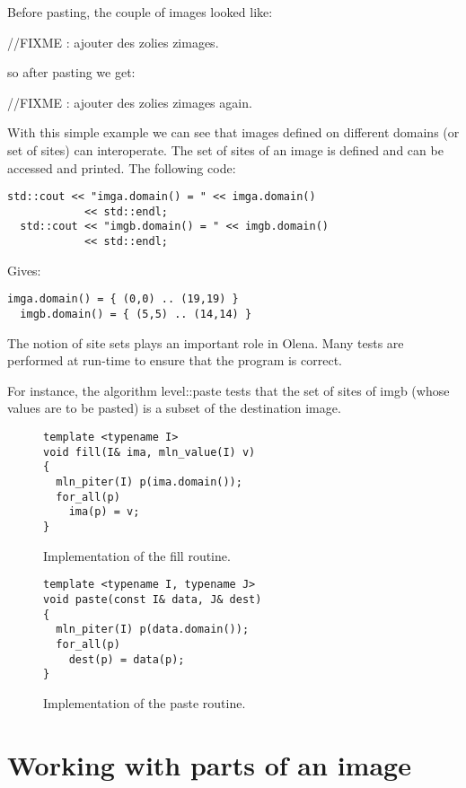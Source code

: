 \documentclass{report}
\begin{document}
Before pasting, the couple of images looked like:

//FIXME : ajouter des zolies zimages.

so after pasting we get:

//FIXME : ajouter des zolies zimages again.

With this simple example we can see that images defined on different domains (or
set of sites) can interoperate.  The set of sites of an image is defined and
can be accessed and printed. The following code:

\begin{lstlisting}[frame=single]
  std::cout << "imga.domain() = " << imga.domain()
            << std::endl;
  std::cout << "imgb.domain() = " << imgb.domain()
            << std::endl;
\end{lstlisting}

Gives:
\begin{lstlisting}[frame=single]
  imga.domain() = { (0,0) .. (19,19) }
  imgb.domain() = { (5,5) .. (14,14) }
\end{lstlisting}

The notion of site sets plays an important role in Olena. Many tests are
performed at run-time to ensure that the program is correct.

For instance, the algorithm level::paste tests that the set of sites of imgb
(whose values are to be pasted) is a subset of the destination image.


\begin{figure}[ht!]
  \begin{lstlisting}[frame=single]
template <typename I>
void fill(I& ima, mln_value(I) v)
{
  mln_piter(I) p(ima.domain());
  for_all(p)
    ima(p) = v;
}
  \end{lstlisting}
  \caption{Implementation of the fill routine.\label{fig:fill_impl}}
\end{figure} 


\begin{figure}[ht!]
  \begin{lstlisting}[frame=single]
template <typename I, typename J>
void paste(const I& data, J& dest)
{
  mln_piter(I) p(data.domain());
  for_all(p)
    dest(p) = data(p);
}
  \end{lstlisting}
  \caption{Implementation of the paste routine.\label{fig:paste_impl}}
\end{figure}

\newpage
\section{Working with parts of an image}
\end{document}
